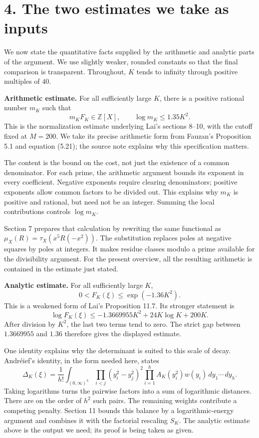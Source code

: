 \documentclass[11pt]{article}
\newcommand{\Z}{\mathbb Z}
\newcommand{\dd}{\,d}
\begin{document}
\newpage
\section*{4. The two estimates we take as inputs}
We now state the quantitative facts supplied by the arithmetic and analytic
parts of the argument. We use slightly weaker, rounded constants so that
the final comparison is transparent. Throughout, $K$ tends to infinity
through positive multiples of $40$.

\textbf{Arithmetic estimate.}
For all sufficiently large $K$, there is a positive rational number $m_K$
such that
\[
 \boxed{m_KF_K\in\Z[X],\qquad \log m_K\leq1.35K^2.}
\]
This is the normalization estimate underlying Lai's sections 8--10,
with the cutoff fixed at $M=200$. We take its precise arithmetic form
from Fauzan's Proposition 5.1 and equation (5.21); the source note explains
why this specification matters.

The content is the bound on the cost, not just the existence of a common
denominator. For each prime, the arithmetic argument bounds its exponent
in every coefficient. Negative exponents require clearing denominators;
positive exponents allow common factors to be divided out. This explains
why $m_K$ is positive and rational, but need not be an integer. Summing the
local contributions controls $\log m_K$.

Section 7 prepares that calculation by rewriting the same functional as
$\mu_X(R)=\tau_X(x^5R(-x^2))$. The substitution replaces poles at negative
squares by poles at integers. It makes residue classes modulo a prime
available for the divisibility argument. For the present overview, all
the resulting arithmetic is contained in the estimate just stated.

\textbf{Analytic estimate.}
For all sufficiently large $K$,
\[
 \boxed{0<F_K(\xi)\leq\exp(-1.36K^2).}
\]
This is a weakened form of Lai's Proposition 11.7. Its stronger statement is
\[
 \log F_K(\xi)\leq
 -1.3669955K^2+24K\log K+200K.
\]
After division by $K^2$, the last two terms tend to zero. The strict gap
between $1.3669955$ and $1.36$ therefore gives the displayed estimate.

One identity explains why the determinant is suited to this scale of decay.
Andr\'eief's identity, in the form needed here, states
\[
 \Delta_K(\xi)=\frac1{h!}\int_{(0,\infty)^h}
 \prod_{i<j}(y_i^2-y_j^2)^2
 \prod_{i=1}^h A_K(y_i^2)w(y_i)\dd y_1\cdots\dd y_h.
\]
Taking logarithms turns the pairwise factors into a sum of logarithmic
distances. There are on the order of $h^2$ such pairs. The remaining
weights contribute a competing penalty. Section 11 bounds this balance
by a logarithmic-energy argument and combines it with the factorial
rescaling $S_K$. The analytic estimate above is the output we need;
its proof is being taken as given.
\end{document}
